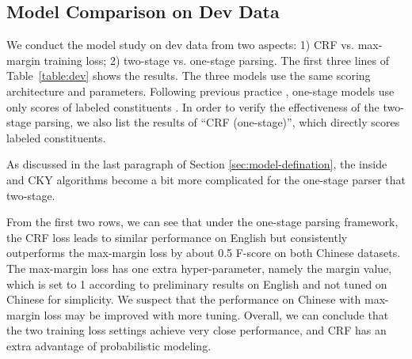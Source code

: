 \documentclass{article}
\begin{document}
\begin{table}[tb]
\subsection{Model Comparison on Dev Data}

We conduct the model study on dev data from two aspects: 1) CRF vs. max-margin training loss; 2) two-stage vs. one-stage parsing.
The first three lines of
Table~\ref{table:dev} shows the results.
The three models use the same scoring architecture and parameters.
Following previous practice \cite{stern-etal-2017-minimal}, one-stage models use only scores of labeled constituents .
In order to verify the effectiveness of the two-stage parsing, we also list the results of ``CRF (one-stage)'', which directly scores labeled constituents.

As discussed in the last paragraph of Section \ref{sec:model-defination}, the inside and CKY algorithms become a bit more complicated for the one-stage parser that two-stage.

From the first two rows, we can see that
under the one-stage parsing framework, the CRF loss leads to similar performance on English
but consistently outperforms the max-margin loss by about 0.5 F-score on both Chinese datasets.
The max-margin loss has one extra hyper-parameter, namely the margin value, which is set to 1 according to preliminary results on English and not tuned on Chinese for simplicity.
We suspect that the performance on Chinese with max-margin loss may be improved with more tuning.
Overall, we can conclude that the two training loss settings achieve very close performance, and CRF has an extra advantage of probabilistic modeling.


\end{table}
\end{document}

